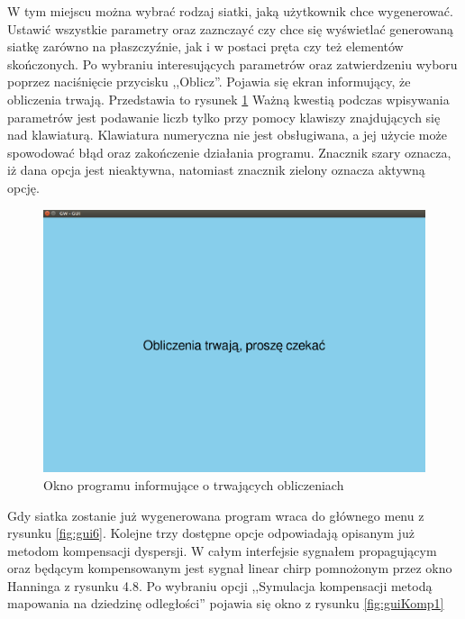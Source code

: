 W tym miejscu można wybrać rodzaj siatki, jaką użytkownik chce wygenerować. Ustawić wszystkie parametry oraz zaznczayć czy chce się wyświetlać generowaną siatkę zarówno na płaszczyźnie, jak i w postaci pręta czy też elementów skończonych. Po wybraniu interesujących parametrów oraz zatwierdzeniu wyboru poprzez naciśnięcie przycisku ,,Oblicz''. Pojawia się ekran informujący, że obliczenia trwają. Przedstawia to rysunek \ref{fig:gui8}
Ważną kwestią podczas wpisywania parametrów jest podawanie liczb tylko przy pomocy klawiszy znajdujących się nad klawiaturą. Klawiatura numeryczna nie jest obsługiwana, a jej użycie może spowodować błąd oraz zakończenie działania programu. Znacznik szary oznacza, iż dana opcja jest nieaktywna, natomiast znacznik zielony oznacza aktywną opcję.

\begin{figure}[h]
\centering
\includegraphics[width=13cm]{Zdjecia/5/kasia/gui8}
\caption{Okno programu informujące o trwających obliczeniach}
\label{fig:gui8}
\end{figure}

Gdy siatka zostanie już wygenerowana program wraca do głównego menu z rysunku \ref{fig:gui6}. Kolejne trzy dostępne opcje odpowiadają opisanym już metodom kompensacji dyspersji. W całym interfejsie sygnałem propagującym oraz będącym kompensowanym jest sygnał linear chirp pomnożonym przez okno Hanninga z rysunku 4.8. Po wybraniu opcji ,,Symulacja kompensacji metodą mapowania na dziedzinę odległości'' pojawia się okno z rysunku \ref{fig:guiKomp1}

